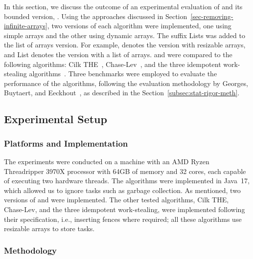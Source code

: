 
In this section, we discuss the outcome of an experimental evaluation of \NCWSM and its bounded version, \BNCWSM.  Using the approaches discussed in Section~\ref{sec-removing-infinite-arrays}, two versions of each algorithm were implemented, one using simple arrays and the other using dynamic arrays. The suffix Lists was added to the list of arrays version. For example, \NCWSM denotes the version with resizable arrays, and \NCWSM List denotes the version with a list of arrays.  \NCWSM and \BNCWSM were compared to the following algorithms: Cilk THE~\cite{DBLP_conf_pldi_FrigoLR98}, Chase-Lev~\cite{circular.work.stealing}, and the three idempotent work-stealing algorithms~\cite{maged.vechev.2009}.  Three benchmarks were employed to evaluate the performance of the algorithms, following the evaluation methodology by Georges, Buytaert, and Eeckhout~\cite{DBLP_conf_oopsla_GeorgesBE07}, as described in the Section~\ref{subsec:stat-rigor-meth}.

\subsection{\label{subsec-experimental-setup}Experimental Setup}

\subsubsection{\label{subsec:implementation}Platforms and Implementation}

The experiments were conducted on a machine with an AMD Ryzen Threadripper 3970X processor with 64GB of memory and 32 cores, each capable of executing two hardware threads. The algorithms were implemented in Java~17, which allowed us to ignore tasks such as garbage collection.  As mentioned, two versions of \NCWSM and \BNCWSM were implemented. The other tested algorithms, Cilk THE, Chase-Lev, and the three idempotent work-stealing, were implemented following their specification, i.e., inserting fences where required; all these algorithms use resizable arrays to store tasks.

\subsubsection{\label{subsec:methodology}Methodology}

